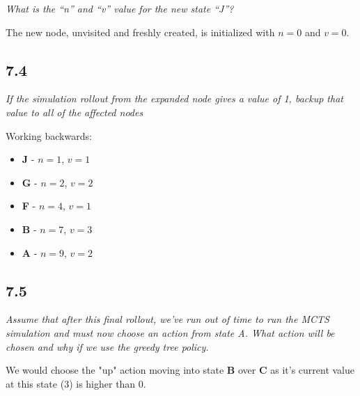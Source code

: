 \documentclass{article}
\begin{document}
\textit{What is the “n” and “v” value for the new state “J”?}

The new node, unvisited and freshly created, is initialized with $n=0$ and $v=0$.

\subsection*{7.4}

\textit{If the simulation rollout from the expanded node gives a value of 1, backup that value to all of the affected nodes}

Working backwards:

\begin{itemize}
    \item \textbf{J} - $n=1$, $v=1$
    \item \textbf{G} - $n=2$, $v=2$
    \item \textbf{F} - $n=4$, $v=1$
    \item \textbf{B} - $n=7$, $v=3$
    \item \textbf{A} - $n=9$, $v=2$
\end{itemize}

\subsection*{7.5}

\textit{Assume that after this final rollout, we've run out of time to run the MCTS simulation and must now choose an action from state A. What action will be chosen and why if we use the greedy tree policy.}

We would choose the "up" action moving into state \textbf{B} over \textbf{C} as it's current value at this state (3) is higher than 0.





\end{document}
